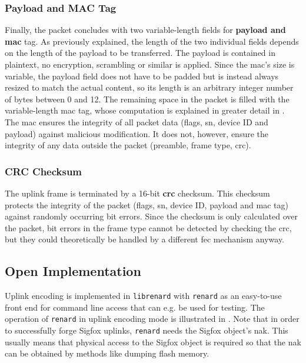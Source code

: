 \subsubsection{Payload and MAC Tag}
Finally, the packet concludes with two variable-length fields for \textbf{payload and \gls{mac}} tag.
As previously explained, the length of the two individual fields depends on the length of the payload to be transferred.
The payload is contained in plaintext, no encryption, scrambling or similar is applied.
Since the \gls{mac}'s size is variable, the payload field does not have to be padded but is instead always resized to match the actual content, so its length is an arbitrary integer number of bytes between 0 and 12.
The remaining space in the packet is filled with the variable-length \gls{mac} tag, whose computation is explained in greater detail in .
The \gls{mac} ensures the integrity of all packet data (flags, \gls{sn}, device ID and payload) against malicious modification.
It does not, however, ensure the integrity of any data outside the packet (preamble, frame type, \gls{crc}).

\subsubsection{CRC Checksum}
The uplink frame is terminated by a 16-bit \textbf{\gls{crc}} checksum.
This checksum protects the integrity of the packet (flags, \gls{sn}, device ID, payload and \gls{mac} tag) against randomly occurring bit errors.
Since the checksum is only calculated over the packet, bit errors in the frame type cannot be detected by checking the \gls{crc}, but they could theoretically be handled by a different \gls{fec} mechanism anyway.

\subsection{Open Implementation}
Uplink encoding is implemented in \texttt{librenard} with \texttt{renard} as an easy-to-use front end for command line access that can e.g. be used for testing.
The operation of \texttt{renard} in uplink encoding mode is illustrated in .
Note that in order to successfully forge Sigfox uplinks, \texttt{renard} needs the Sigfox object's \gls{nak}.
This usually means that physical access to the Sigfox object is required so that the \gls{nak} can be obtained by methods like dumping flash memory.

